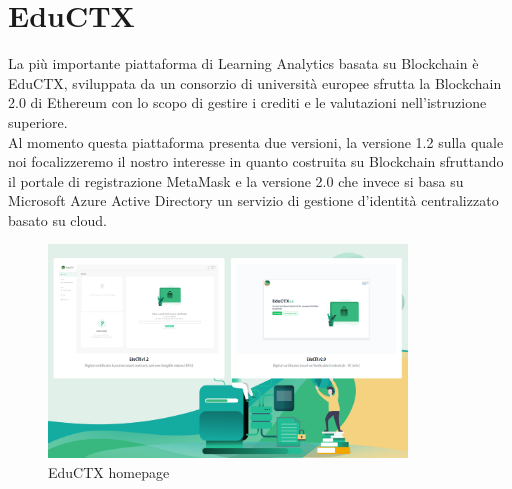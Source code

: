 \section{EduCTX}
La più importante piattaforma di Learning Analytics basata su Blockchain è EduCTX, sviluppata da un consorzio di università europee sfrutta la Blockchain 2.0 di Ethereum con lo scopo di gestire i crediti e le valutazioni nell'istruzione superiore.
\\Al momento questa piattaforma presenta due versioni, la versione 1.2 sulla quale noi focalizzeremo il nostro interesse in quanto costruita su Blockchain
sfruttando il portale di registrazione MetaMask e la versione 2.0 che invece si basa su Microsoft Azure Active Directory un servizio di gestione d'identità centralizzato basato su cloud.
\begin{figure}[h]
    \centering
    \includegraphics[width=0.85\textwidth]{Immagini/EduCTX.PNG}
    \caption{EduCTX homepage}
\end{figure}

